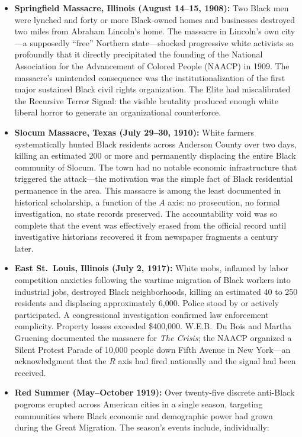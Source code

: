 \begin{itemize}
    \item \textbf{Springfield Massacre, Illinois (August 14--15, 1908):} Two Black men were lynched and forty or more Black-owned homes and businesses destroyed two miles from Abraham Lincoln's home. The massacre in Lincoln's own city---a supposedly ``free'' Northern state---shocked progressive white activists so profoundly that it directly precipitated the founding of the National Association for the Advancement of Colored People (NAACP) in 1909. The massacre's unintended consequence was the institutionalization of the first major sustained Black civil rights organization. The Elite had miscalibrated the Recursive Terror Signal: the visible brutality produced enough white liberal horror to generate an organizational counterforce.

    \item \textbf{Slocum Massacre, Texas (July 29--30, 1910):} White farmers systematically hunted Black residents across Anderson County over two days, killing an estimated 200 or more and permanently displacing the entire Black community of Slocum. The town had no notable economic infrastructure that triggered the attack---the motivation was the simple fact of Black residential permanence in the area. This massacre is among the least documented in historical scholarship, a function of the $A$ axis: no prosecution, no formal investigation, no state records preserved. The accountability void was so complete that the event was effectively erased from the official record until investigative historians recovered it from newspaper fragments a century later.

    \item \textbf{East St.\ Louis, Illinois (July 2, 1917):} White mobs, inflamed by labor competition anxieties following the wartime migration of Black workers into industrial jobs, destroyed Black neighborhoods, killing an estimated 40 to 250 residents and displacing approximately 6,000. Police stood by or actively participated. A congressional investigation confirmed law enforcement complicity. Property losses exceeded \$400,000. W.E.B.\ Du Bois and Martha Gruening documented the massacre for \textit{The Crisis}; the NAACP organized a Silent Protest Parade of 10,000 people down Fifth Avenue in New York---an acknowledgment that the $R$ axis had fired nationally and the signal had been received.

    \item \textbf{Red Summer (May--October 1919):} Over twenty-five discrete anti-Black pogroms erupted across American cities in a single season, targeting communities where Black economic and demographic power had grown during the Great Migration. The season's events include, individually:


\end{itemize}

